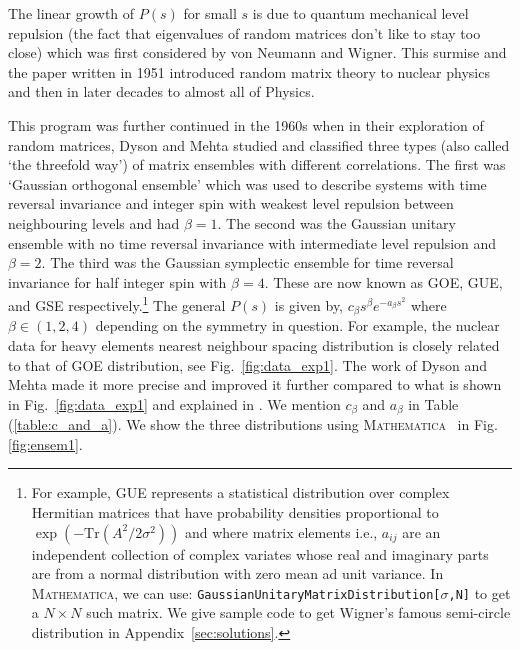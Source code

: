 \documentclass[11pt]{article}
\newcommand{\MA}{\textsc{Mathematica}}
\begin{document}
The linear growth of $P(s)$ for small $s$ is due to quantum mechanical level repulsion (the fact that eigenvalues of random matrices don't like to stay too close)
which was first considered by von Neumann and Wigner. 
This surmise and the paper written in 1951
\cite{Wigner1951OnTS} introduced random matrix theory 
to nuclear physics and then in later decades to almost all of Physics.

This program was further continued in the 1960s when in their exploration of random matrices, Dyson and Mehta studied and classified three types (also called `the threefold way') of matrix ensembles with different correlations. The first was `Gaussian orthogonal ensemble' which was used to describe systems with time reversal invariance and integer spin with weakest level repulsion between neighbouring levels and had $\beta=1$. The second was the Gaussian unitary ensemble with no time reversal invariance with intermediate level repulsion and $\beta=2$. The third was the Gaussian symplectic ensemble for time reversal invariance for half integer spin with $\beta=4$. These are now known as GOE, GUE, and GSE respectively.\footnote{For example, GUE represents a statistical distribution over complex Hermitian matrices 
that have probability densities proportional to $ \exp(-\mbox{Tr}(A^2/2\sigma^2))$ and
where matrix elements i.e., $a_{ij}$ are an independent collection of complex 
variates whose real and imaginary parts are from a normal distribution
with zero mean ad unit variance. In \MA, we can use: 
\texttt{GaussianUnitaryMatrixDistribution[$\sigma$,N]}
to get a $N \times N$ such matrix. We give sample code to get Wigner's famous semi-circle
distribution in Appendix~\ref{sec:solutions}.} 
The general $P(s)$ is given by, $c_{\beta}s^{\beta} e^{-a_{\beta}s^2}$ 
where $\beta \in (1,2,4)$ depending on the symmetry in question. 
For example, the nuclear data for heavy elements nearest neighbour spacing distribution
is closely related to that of GOE distribution, see Fig.~\ref{fig:data_exp1}. 
The work of Dyson and Mehta made it more precise and improved it further 
compared to what is shown in Fig.~\ref{fig:data_exp1} and explained in 
\cite{PhysRevLett.48.1086}. We mention $c_{\beta}$ and  $a_{\beta}$ in Table (\ref{table:c_and_a}). 
We show the three distributions using \MA~ in Fig. \ref{fig:ensem1}.  
\end{document}
